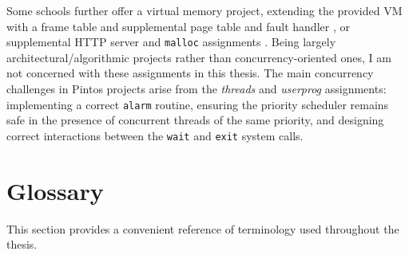 Some schools further offer a virtual memory project, extending the provided VM with a frame table and supplemental page table and fault handler \cite{standford-cs140,uchicago-cs230}, or supplemental HTTP server and {\tt malloc} assignments \cite{berkeley-cs162}.
Being largely architectural/algorithmic projects rather than concurrency-oriented ones, I am not concerned with these assignments in this thesis.
The main concurrency challenges in Pintos projects arise from the {\em threads} and {\em userprog} assignments:
implementing a correct {\tt alarm} routine,
ensuring the priority scheduler remains safe in the presence of concurrent threads of the same priority,
and designing correct interactions between the {\tt wait} and {\tt exit} system calls.

\section{Glossary}
\label{sec:glossary}

This section provides a convenient reference of terminology used throughout the thesis.


